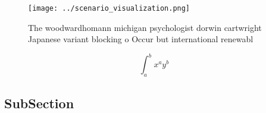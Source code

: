 \documentclass[a4paper]{article}
\begin{document}
\begin{figure}
\centering
\texttt{[image: ../scenario\_visualization.png]}
\caption{The woodwardhomann michigan psychologist dorwin cartwright Japanese variant blocking o Occur but international renewabl
}
\end{figure}
 
\[ \int_{a}^{b}{x^{a}y^{b}} \]

\subsection{SubSection}
\end{document}
